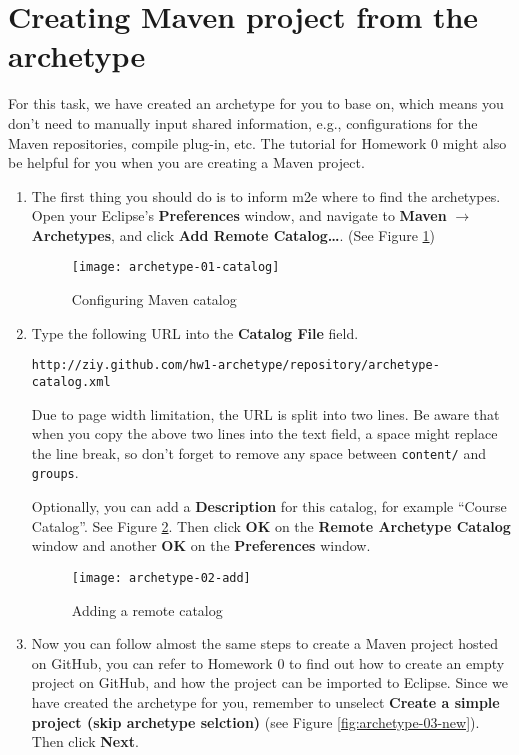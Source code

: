 
\section{Creating Maven project from the archetype}

For this task, we have created an archetype for you to base on, which means you
don't need to manually input shared information, e.g., configurations for the
Maven repositories, compile plug-in, etc. The tutorial for Homework 0 might also
be helpful for you when you are creating a Maven project.

\begin{enumerate}

\item The first thing you should do is to inform m2e where to find the
archetypes. Open your Eclipse's \textbf{Preferences} window, and navigate to
\textbf{Maven} $\rightarrow$ \textbf{Archetypes}, and click \textbf{Add Remote
Catalog\ldots}. (See Figure \ref{fig:archetype-01-catalog})

\begin{figure}[t]
\centering
\texttt{[image: archetype-01-catalog]}
\caption{Configuring Maven catalog\label{fig:archetype-01-catalog}}
\end{figure}

\item Type the following URL into the \textbf{Catalog File} field.

\begin{verbatim}
http://ziy.github.com/hw1-archetype/repository/archetype-catalog.xml
\end{verbatim}

Due to page width limitation, the URL is split into two lines. Be aware that
when you copy the above two lines into the text field, a space might replace the
line break, so don't forget to remove any space between \verb|content/| and
\verb|groups|.

Optionally, you can add a \textbf{Description} for this catalog, for example
``Course Catalog''. See Figure \ref{fig:archetype-02-add}. Then click
\textbf{OK} on the \textbf{Remote Archetype Catalog} window and another
\textbf{OK} on the \textbf{Preferences} window.

\begin{figure}[t]
\centering
\texttt{[image: archetype-02-add]}
\caption{Adding a remote catalog\label{fig:archetype-02-add}}
\end{figure}

\item Now you can follow almost the same steps to create a Maven project hosted
on GitHub, you can refer to Homework 0 to find out how to create an empty
project on GitHub, and how the project can be imported to Eclipse. Since we have
created the archetype for you, remember to unselect \textbf{Create a simple
project (skip archetype selction)} (see Figure \ref{fig:archetype-03-new}). Then
click \textbf{Next}.
 

\end{enumerate}
